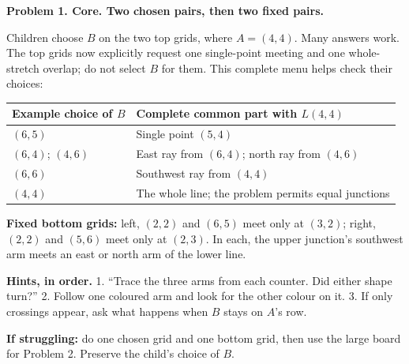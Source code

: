 \documentclass[11pt,letterpaper]{article}
\newcommand{\head}[1]{\par\vspace{4pt}{\large\bfseries #1}\par\vspace{1pt}}
\newcommand{\prob}[2]{\par\vspace{4pt}\textbf{Problem #1. #2}\par}
\newcommand{\hints}[1]{\par\textbf{Hints, in order.} #1\par}
\begin{document}
\head{Student page 2: choice and crossings}
\prob{1}{Core. Two chosen pairs, then two fixed pairs.}
Children choose $B$ on the two top grids, where $A=(4,4)$. Many answers work. The top grids now explicitly request one single-point meeting and one whole-stretch overlap; do not select $B$ for them. This complete menu helps check their choices:

\par\noindent\begin{tabularx}{\linewidth}{@{}p{1.35in}X@{}}
\textbf{Example choice of $B$} & \textbf{Complete common part with $L(4,4)$}\\\hline
$(6,5)$ & Single point $(5,4)$\\
$(6,4)$; $(4,6)$ & East ray from $(6,4)$; north ray from $(4,6)$\\
$(6,6)$ & Southwest ray from $(4,4)$\\
$(4,4)$ & The whole line; the problem permits equal junctions
\end{tabularx}

\textbf{Fixed bottom grids:} left, $(2,2)$ and $(6,5)$ meet only at $(3,2)$; right, $(2,2)$ and $(5,6)$ meet only at $(2,3)$. In each, the upper junction's southwest arm meets an east or north arm of the lower line.
\hints{1. ``Trace the three arms from each counter. Did either shape turn?'' 2. Follow one coloured arm and look for the other colour on it. 3. If only crossings appear, ask what happens when $B$ stays on $A$'s row.}
\textbf{If struggling:} do one chosen grid and one bottom grid, then use the large board for Problem 2. Preserve the child's choice of $B$.
\end{document}

